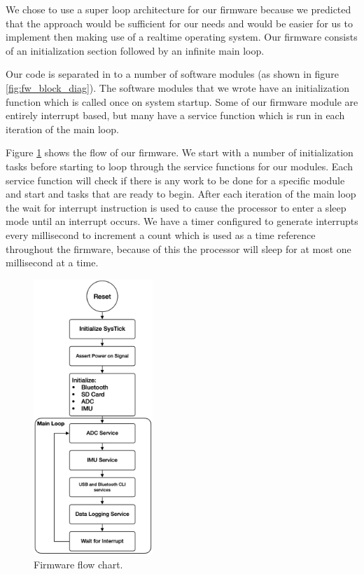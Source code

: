 We chose to use a super loop architecture for our firmware because we predicted
that the approach would be sufficient for our needs and would be easier for us
to implement then making use of a realtime operating system. Our firmware
consists of an initialization section followed by an infinite main loop.

Our code is separated in to a number of software modules (as shown in figure
\ref{fig:fw_block_diag}). The software modules that we wrote have an
initialization function which is called once on system startup. Some of our
firmware module are entirely interrupt based, but many have a service function
which is run in each iteration of the main loop.

Figure \ref{fig:fw_flow} shows the flow of our firmware. We start with a number
of initialization tasks before starting to loop through the service functions
for our modules. Each service function will check if there is any work to be
done for a specific module and start and tasks that are ready to begin. After
each iteration of the main loop the wait for interrupt instruction is used to
cause the processor to enter a sleep mode until an interrupt occurs. We have a
timer configured to generate interrupts every millisecond to increment a count
which is used as a time reference throughout the firmware, because of this the
processor will sleep for at most one millisecond at a time.

\begin{figure}[!htb]
\centering
\includegraphics[width=0.4\textwidth]{images/fw_flow.png}
\caption{Firmware flow chart.}
\label{fig:fw_flow}
\end{figure}

